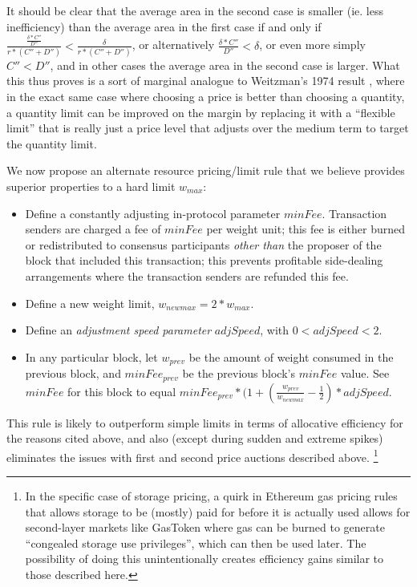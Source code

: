 \documentclass[12pt, final]{article}
\begin{document}
It should be clear that the average area in the second case is smaller (ie. less inefficiency) than the average area in the first case if and only if $\frac{\frac{\delta * C''}{D''}}{r * (C'' + D'')} < \frac{\delta}{r * (C'' + D'')}$, or alternatively $\frac{\delta * C''}{D''} < \delta$, or even more simply $C'' < D''$, and in other cases the average area in the second case is larger. What this thus proves is a sort of marginal analogue to Weitzman's 1974 result \cite{weitzman1974prices}, where in the exact same case where choosing a price is better than choosing a quantity, a quantity limit can be improved on the margin by replacing it with a ``flexible limit'' that is really just a price level that adjusts over the medium term to target the quantity limit.

We now propose an alternate resource pricing/limit rule that we believe provides superior properties to a hard limit $w_{max}$:

\begin{itemize}
\item Define a constantly adjusting in-protocol parameter $minFee$. Transaction senders are charged a fee of $minFee$ per weight unit; this fee is either burned or redistributed to consensus participants \emph{other than} the proposer of the block that included this transaction; this prevents profitable side-dealing arrangements where the transaction senders are refunded this fee.
\item Define a new weight limit, $w_{newmax} = 2 * w_{max}$.
\item Define an \emph{adjustment speed parameter} $adjSpeed$, with $0 < adjSpeed < 2$.
\item In any particular block, let $w_{prev}$ be the amount of weight consumed in the previous block, and $minFee_{prev}$ be the previous block's $minFee$ value. See $minFee$ for this block to equal $minFee_{prev} * (1 + (\frac{w_{prev}}{w_{newmax}} - \frac{1}{2}) * adjSpeed$.
\end{itemize}

This rule is likely to outperform simple limits in terms of allocative efficiency for the reasons cited above, and also (except during sudden and extreme spikes) eliminates the issues with first and second price auctions described above. \footnote{In the specific case of storage pricing, a quirk in Ethereum gas pricing rules that allows storage to be (mostly) paid for before it is actually used allows for second-layer markets like GasToken\cite{gastoken} where gas can be burned to generate ``congealed storage use privileges'', which can then be used later. The possibility of doing this unintentionally creates efficiency gains similar to those described here.}
\end{document}
